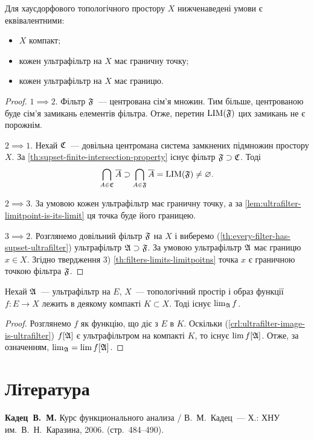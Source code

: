 \begin{theorem}
    Для хаусдорфового топологічного простору $X$ нижченаведені умови є еквівалентними:
    \begin{itemize}
        \item $X$ компакт;
        \item кожен ультрафільтр на $X$ має граничну точку;
        \item кожен ультрафільтр на $X$ має границю.
    \end{itemize}
\end{theorem}
\begin{proof}
    $1 \implies 2$. Фільтр $\frak F$~--- центрована сім'я множин. Тим більше, центрованою буде сім'я замикань елементів фільтра. Отже, перетин $\LIM(\frak F)$ цих замикань не є порожнім. \medskip
    
    $2 \implies 1$. Нехай $\frak C$~--- довільна центромана система замкнених підмножин простору $X$. За \cref{th:supset-finite-intersection-property} існує фільтр $\frak F \supset \frak C$. Тоді
    \begin{equation*}
        \bigcap_{A \in \frak C} \closure A \supset \bigcap_{A \in \frak F} \closure A = \LIM(\frak F) \ne \emptyset.
    \end{equation*}
    
    $2 \implies 3$. За умовою кожен ультрафільтр має граничну точку, а за \cref{lem:ultrafilter-limitpoint-is-its-limit} ця точка буде його границею. \medskip
    
    $3 \implies 2$. Розглянемо довільний фільтр $\frak F$ на $X$ і виберемо (\cref{th:every-filter-has-supset-ultrafilter}) ультрафільтр $\frak A \supset \frak F$. За умовою ультрафільтр $\frak A$ має границю $x \in X$. Згідно твердження 3) \cref{th:filters-limits-limitpoitns} точка $x$ є граничною точкою фільтра $\frak F$.
\end{proof}

\begin{corollary}
    Нехай $\frak A$~--- ультрафільтр на $E$, $X$~--- топологічний простір і образ функції $f: E \to X$ лежить в деякому компакті $K \subset X$. Тоді існує $\lim_{\frak A} f$.
\end{corollary}
\begin{proof}
    Розглянемо $f$ як функцію, що діє з $E$ в $K$. Оскільки (\cref{crl:ultrafilter-image-is-ultrafilter}) $f[\frak A]$ є ультрафільтром на компакті $K$, то існує $\lim f[\frak A]$. Отже, за означенням, $\lim_{\frak A} = \lim f[\frak A]$.
\end{proof}

\section{Література}

\begin{enumerate}[label={[\arabic*]}]
\item \textbf{Кадец~В.~М.}
Курс функционального анализа /
В.~М.~Кадец~---
Х.: ХНУ им.~В.~Н.~Каразина, 2006. (стр.~484--490).
\end{enumerate}
